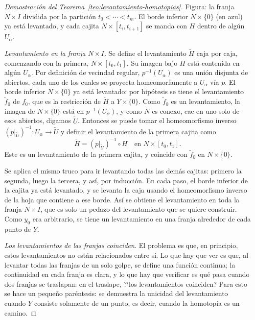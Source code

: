 \documentclass[11pt]{article}
\begin{document}
\begin{proof}[Demostración del Teorema~\ref{teo:levantamiento-homotopias}]
\noindent Figura: la franja $N\times I$ dividida por la partición $t_0<\cdots<t_m$. El borde inferior $N\times\{0\}$ (en azul) ya está levantado, y cada cajita $N\times[t_i,t_{i+1}]$ se manda con $H$ dentro de algún $U_\alpha$.

\medskip\noindent\emph{Levantamiento en la franja $N\times I$.} Se define el levantamiento $\tilde H$ caja por caja, comenzando con la primera, $N\times[t_0,t_1]$. Su imagen bajo $H$ está contenida en algún $U_\alpha$. Por definición de vecindad regular, $p^{-1}(U_\alpha)$ es una unión disjunta de abiertos, cada uno de los cuales se proyecta homeomorfamente a $U_\alpha$ vía $p$. El borde inferior $N\times\{0\}$ ya está levantado: por hipótesis se tiene el levantamiento $\tilde f_0$ de $f_0$, que es la restricción de $\tilde H$ a $Y\times\{0\}$. Como $\tilde f_0$ es un levantamiento, la imagen de $N\times\{0\}$ está en $p^{-1}(U_\alpha)$, y como $N$ es conexo, cae en uno solo de esos abiertos, digamos $\tilde U$. Entonces se puede tomar el homeomorfismo inverso $(p|_{\tilde U})^{-1}\colon U_\alpha\to\tilde U$ y definir el levantamiento de la primera cajita como
\[
  \tilde H=(p|_{\tilde U})^{-1}\circ H\quad\text{en }N\times[t_0,t_1].
\]
Este es un levantamiento de la primera cajita, y coincide con $\tilde f_0$ en $N\times\{0\}$.

Se aplica el mismo truco para ir levantando todas las demás cajitas: primero la segunda, luego la tercera, y así, por inducción. En cada paso, el borde inferior de la cajita ya está levantado, y se levanta la caja usando el homeomorfismo inverso de la hoja que contiene a ese borde. Así se obtiene el levantamiento en toda la franja $N\times I$, que es solo un pedazo del levantamiento que se quiere construir. Como $y_0$ era arbitrario, se tiene un levantamiento en una franja alrededor de cada punto de $Y$.

\medskip\noindent\emph{Los levantamientos de las franjas coinciden.} El problema es que, en principio, estos levantamientos no están relacionados entre sí. Lo que hay que ver es que, al levantar todas las franjas de un solo golpe, se define una función continua; la continuidad en cada franja es clara, y lo que hay que verificar es qué pasa cuando dos franjas se traslapan: en el traslape, ?`los levantamientos coinciden? Para esto se hace un pequeño paréntesis: se demuestra la unicidad del levantamiento cuando $Y$ consiste solamente de un punto, es decir, cuando la homotopía es un camino.


\end{proof}
\end{document}
